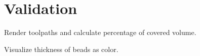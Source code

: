 \section{Validation}
Render toolpaths and calculate percentage of covered volume.

Visualize thickness of beads as color.